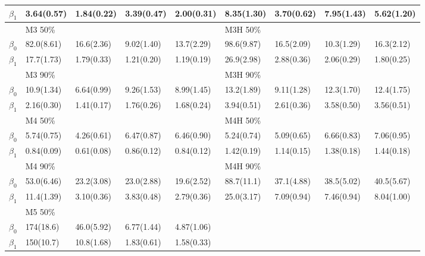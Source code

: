 \documentclass[12pt]{article}
\begin{document}
\begin{center}
\begin{table}[h]
\begin{tabular}[tb]{c|llll|llll}
      $\beta_1$ & 3.64(0.57) & 1.84(0.22) & 3.39(0.47) & 2.00(0.31) & 8.35(1.30) & 3.70(0.62) & 7.95(1.43) & 5.62(1.20) \\
      \hline
                & M3 50\%    &            &            &            & M3H 50\%   &            &            &            \\
      $\beta_0$ & 82.0(8.61) & 16.6(2.36) & 9.02(1.40) & 13.7(2.29) & 98.6(9.87) & 16.5(2.09) & 10.3(1.29) & 16.3(2.12) \\
      $\beta_1$ & 17.7(1.73) & 1.79(0.33) & 1.21(0.20) & 1.19(0.19) & 26.9(2.98) & 2.88(0.36) & 2.06(0.29) & 1.80(0.25) \\
                & M3 90\%    &            &            &            & M3H 90\%   &            &            &            \\
      $\beta_0$ & 10.9(1.34) & 6.64(0.99) & 9.26(1.53) & 8.99(1.45) & 13.2(1.89) & 9.11(1.28) & 12.3(1.70) & 12.4(1.75) \\
      $\beta_1$ & 2.16(0.30) & 1.41(0.17) & 1.76(0.26) & 1.68(0.24) & 3.94(0.51) & 2.61(0.36) & 3.58(0.50) & 3.56(0.51) \\
      \hline
                & M4 50\%    &            &            &            & M4H 50\%   &            &            &            \\
      $\beta_0$ & 5.74(0.75) & 4.26(0.61) & 6.47(0.87) & 6.46(0.90) & 5.24(0.74) & 5.09(0.65) & 6.66(0.83) & 7.06(0.95) \\
      $\beta_1$ & 0.84(0.09) & 0.61(0.08) & 0.86(0.12) & 0.84(0.12) & 1.42(0.19) & 1.14(0.15) & 1.38(0.18) & 1.44(0.18) \\
                & M4 90\%    &            &            &            & M4H 90\%   &            &            &            \\
      $\beta_0$ & 53.0(6.46) & 23.2(3.08) & 23.0(2.88) & 19.6(2.52) & 88.7(11.1) & 37.1(4.88) & 38.5(5.02) & 40.5(5.67) \\
      $\beta_1$ & 11.4(1.39) & 3.10(0.36) & 3.83(0.48) & 2.79(0.36) & 25.0(3.17) & 7.09(0.94) & 7.46(0.94) & 8.04(1.00) \\
      \hline
                & M5 50\%    &            &            &            &            &            &            &            \\
      $\beta_0$ & 174(18.6)  & 46.0(5.92) & 6.77(1.44) & 4.87(1.06) &            &            &            &            \\
      $\beta_1$ & 150(10.7)  & 10.8(1.68) & 1.83(0.61) & 1.58(0.33) &            &            &            &            \\

\end{tabular}
\end{table}
\end{center}
\end{document}
